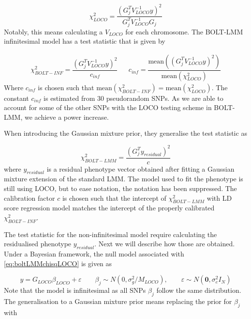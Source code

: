 \begin{equation}\label{eq:boltLMMchisqLOCO}
\chi^2_{LOCO} = \dfrac{(G_j^TV_{LOCO}^{-1}y)^2}{G_j^TV_{LOCO}^{-1}G_j}
\end{equation}
Notably, this means calculating a $ V_{LOCO} $ for each chromosome. The BOLT-LMM infinitesimal model has a test statistic that is given by

\begin{align}\label{eq:boltLMMinfchisq}
\chi^2_{BOLT-INF} = \dfrac{(G_j^TV_{LOCO}^{-1}y)^2}{c_{inf}} & &c_{inf} = \dfrac{\text{mean}((G_j^TV_{LOCO}^{-1}y)^2)}{\text{mean}(\chi^2_{LOCO})}
\end{align}
Where $ c_{inf} $ is chosen such that $ \text{mean}(\chi^2_{BOLT-INF}) = \text{mean}(\chi^2_{LOCO})$. The constant $ c_{inf} $ is estimated from $ 30 $ pseudorandom SNPs. As we are able to account for some of the other SNPs with the LOCO testing scheme in BOLT-LMM, we achieve a power increase.

When introducing the Gaussian mixture prior, they generalise the test statistic as

\begin{equation}\label{eq:boltMixturePriorTestChisq}
\chi^2_{BOLT-LMM} = \dfrac{\left( G_j^T y_{residual}\right)^2}{c}
\end{equation}
where $ y_{residual} $ is a residual phenotype vector obtained after fitting a Gaussian mixture extension of the standard LMM. The model used to fit the phenotype is still using LOCO, but to ease notation, the notation has been suppressed. The calibration factor $ c $ is chosen such that the intercept of $ \chi^2_{BOLT-LMM} $ with LD score regression\cite{bulik2015ld} model matches the intercept of the properly calibrated $ \chi^2_{BOLT-INF} $.

The test statistic for the non-infinitesimal model require calculating the residualised phenotype $ y_{residual} $. Next we will describe how those are obtained. Under a Bayesian framework, the null model associated with \cref{eq:boltLMMchisqLOCO} is given as

\begin{equation}\label{eq:boltBayesLMMWithPrior}
y = G_{LOCO} \beta_{LOCO} + \varepsilon \qquad \beta_j \sim N(0, \sigma^2_g /M_{LOCO}), \qquad \varepsilon \sim N(\mathbf{0},\sigma_e^2I_N)
\end{equation}
Note that the model is infinitesimal as all SNPs $ \beta_j $ follow the same distribution. The generalisation to a Gaussian mixture prior means replacing the prior for $ \beta_j $ with 

